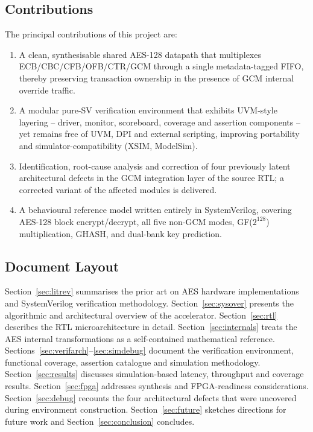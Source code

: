 \documentclass[conference,10pt,a4paper]{IEEEtran}
\begin{document}
\subsection{Contributions}
The principal contributions of this project are:
\begin{enumerate}[leftmargin=*]
  \item A clean, synthesisable shared AES-128 datapath that multiplexes
        ECB/CBC/CFB/OFB/CTR/GCM through a single metadata-tagged FIFO,
        thereby preserving transaction ownership in the presence of GCM
        internal override traffic.
  \item A modular pure-SV verification environment that exhibits UVM-style
        layering -- driver, monitor, scoreboard, coverage and assertion
        components -- yet remains free of UVM, DPI and external scripting,
        improving portability and simulator-compatibility (XSIM, ModelSim).
  \item Identification, root-cause analysis and correction of four
        previously latent architectural defects in the GCM integration
        layer of the source RTL; a corrected variant of the affected
        modules is delivered.
  \item A behavioural reference model written entirely in SystemVerilog,
        covering AES-128 block encrypt/decrypt, all five non-GCM modes,
        GF($2^{128}$) multiplication, GHASH, and dual-bank key prediction.
\end{enumerate}

\subsection{Document Layout}
Section~\ref{sec:litrev} summarises the prior art on AES hardware
implementations and SystemVerilog verification methodology.  
Section~\ref{sec:sysover} presents the algorithmic and architectural
overview of the accelerator.  Section~\ref{sec:rtl} describes the RTL
microarchitecture in detail.  Section~\ref{sec:internals} treats the AES
internal transformations as a self-contained mathematical reference.
Sections~\ref{sec:verifarch}--\ref{sec:simdebug} document the verification
environment, functional coverage, assertion catalogue and simulation
methodology.  Section~\ref{sec:results} discusses simulation-based latency,
throughput and coverage results.  Section~\ref{sec:fpga} addresses
synthesis and FPGA-readiness considerations.  Section~\ref{sec:debug}
recounts the four architectural defects that were uncovered during
environment construction.  Section~\ref{sec:future} sketches directions
for future work and Section~\ref{sec:conclusion} concludes.
\end{document}
